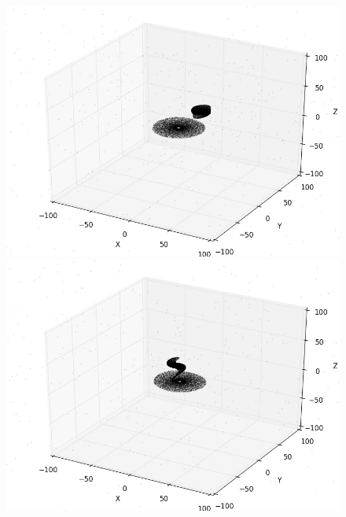 \documentclass[10pt,letterpaper]{article}
\begin{document}
\begin{figure}[!htb]
  \includegraphics[width=\linewidth]{figures/galaxy_collisions/rk4_parabolic_orbit_10000_particles_counterclockwise_velx_escape_fig1.png}
  \subcaption{}\label{fig:rk4_parabolic_orbit_10000_particles_counterclockwise_velx_escape_fig1}
\endminipage\hfill
{}
  \includegraphics[width=\linewidth]{figures/galaxy_collisions/rk4_parabolic_orbit_10000_particles_counterclockwise_velx_escape_fig2.png}
  \subcaption{}\label{fig:rk4_parabolic_orbit_10000_particles_counterclockwise_velx_escape_fig2}
\endminipage\hfill
{}%

\end{figure}
\end{document}

